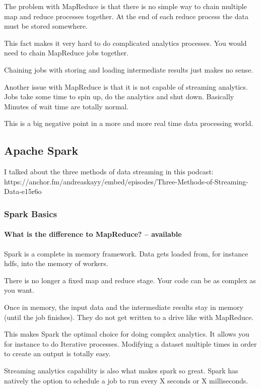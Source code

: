 \documentclass[12pt]{scrartcl} %
\begin{document}
The problem with MapReduce is that there is no simple way to chain multiple map and reduce processes together. At the end of each reduce process the data must be stored somewhere.

This fact makes it very hard to do complicated analytics processes. You would need to chain MapReduce jobs together.

Chaining jobs with storing and loading intermediate results just makes no sense.

Another issue with MapReduce is that it is not capable of streaming analytics. Jobs take some time to spin up, do the analytics and shut down. Basically Minutes of wait time are totally normal.

This is a big negative point in a more and more real time data processing world.


 
\subsection{Apache Spark}
I talked about the three methods of data streaming in this podcast: https://anchor.fm/andreaskayy/embed/episodes/Three-Methods-of-Streaming-Data-e15r6o

\subsubsection{Spark Basics}

\paragraph{What is the difference to MapReduce? -- available}
Spark is a complete in memory framework. Data gets loaded from, for instance hdfs, into the memory of workers.

There is no longer a fixed map and reduce stage. Your code can be as complex as you want.

Once in memory, the input data and the intermediate results stay in memory (until the job finishes). They do not get written to a drive like with MapReduce.

This makes Spark the optimal choice for doing complex analytics. It allows you for instance to do Iterative processes. Modifying a dataset multiple times in order to create an output is totally easy.

Streaming analytics capability is also what makes spark so great. Spark has natively the option to schedule a job to run every X seconds or X milliseconds.
\end{document}
